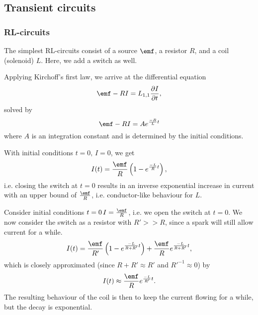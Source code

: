 \subsection{Transient circuits}
    \subsubsection{RL-circuits}
        The simplest RL-circuits consist of a source $\emf$, a resistor $R$, and a coil (solenoid) $L$.
        Here, we add a switch as well.

        Applying Kirchoff's first law, we arrive at the differential equation
        \begin{equation}
            \emf - RI = L_{1,1}\frac{\partial I}{\partial t},
        \end{equation}
        solved by
        \begin{equation}
            \emf - RI = Ae^{\frac{-R}{L}t}
        \end{equation}
        where $A$ is an integration constant and is determined by the initial conditions.

        With initial conditions $t=0,\, I=0$, we get 
        \begin{equation}
            I(t) = \frac{\emf}{R}\left(1-e^{\frac{-L}{R}t}\right),
        \end{equation}
        i.e. closing the switch at $t=0$ results in an inverse exponential increase in current 
        with an upper bound of $\frac{\emf}{R}$, i.e. conductor-like behaviour for $L$.

        Consider initial conditions $t=0\, I = \frac{\emf}{R}$, i.e. we open the switch at $t=0$.
        We now consider the switch as a resistor with $R' >> R$, since a spark will still allow current for a while.
        \begin{equation}
            I(t) = \frac{\emf}{R'}\left(1-e^{\frac{-L}{R+R'}t}\right) + \frac{\emf}{R} e^{\frac{-L}{R+R'}t},
        \end{equation}
        which is closely approximated (since $R+R' \approx R'$ and $R'^{-1} \approx 0$) by
        \begin{equation}
            I(t) \approx \frac{\emf}{R}e^{\frac{-L}{R'}t}.
        \end{equation}
        The resulting behaviour of the coil is then to keep the current flowing for a while, but the decay is exponential.

